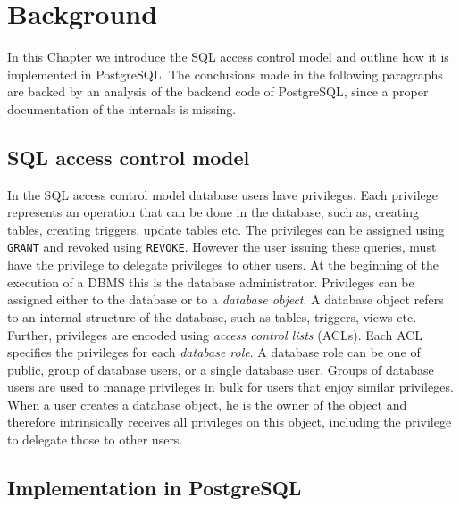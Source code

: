 \section{Background}

In this Chapter we introduce the SQL access control model and outline how it is implemented in PostgreSQL.
%
The conclusions made in the following paragraphs are backed by an analysis of the backend code of PostgreSQL, since a proper documentation of the internals is missing.

\subsection{SQL access control model}

In the SQL access control model database users have privileges. 
%
Each privilege represents an operation that can be done in the database, such as, creating tables, creating triggers, update tables etc.
%
The privileges can be assigned using \texttt{GRANT} and revoked using \texttt{REVOKE}.
%
However the user issuing these queries, must have the privilege to delegate privileges to other users.
%
At the beginning of the execution of a DBMS this is the database administrator.
%
Privileges can be assigned either to the database or to a \emph{database object}.
%
A database object refers to an internal structure of the database, such as tables, triggers, views etc.
%
Further, privileges are encoded using \emph{access control lists} (ACLs). 
%
Each ACL specifies the privileges for each \emph{database role}.
%
A database role can be one of public, group of database users, or a single database user.
%
Groups of database users are used to manage privileges in bulk for users that enjoy similar privileges.
%
When a user creates a database object, he is the owner of the object and therefore intrinsically receives all privileges on this object, including the privilege to delegate those to other users.

\subsection{Implementation in PostgreSQL}

